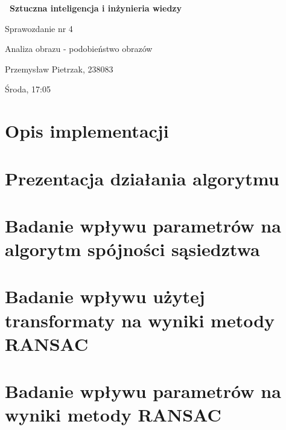 \documentclass[a4paper,10pt]{article}
\begin{document}
    \begin{titlepage}
     \vspace*{\fill}
    
     \vspace*{-4cm}
     \Huge\bfseries\
     {Sztuczna inteligencja i inżynieria wiedzy}
    
     \LARGE
     \centering
     \vspace{2cm}
     {Sprawozdanie nr 4}
    
     \Large
     \centering
     {Analiza obrazu - podobieństwo obrazów}
     
     \vspace*{0.5cm}
     
     \centering
     \large 
     \vspace{0.5cm}
     Przemysław Pietrzak, 238083
     
     Środa, 17:05
     
     \vspace*{\fill}
     \restoregeometry
    \end{titlepage}
    
    \newpage
    \tableofcontents
    
    \newpage
    \justify
    \section{Opis implementacji}
    
    
    \justify
    \section{Prezentacja działania algorytmu}
    
    
    \newpage
    \justify
    \section{Badanie wpływu parametrów na algorytm spójności sąsiedztwa}
    
    
    \newpage
    \justify
    \section{Badanie wpływu użytej transformaty na wyniki metody RANSAC}
    
    
    \newpage
    \justify
    \section{Badanie wpływu parametrów  na wyniki metody RANSAC}
    
    
\end{document}
